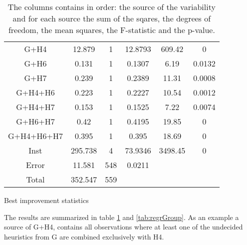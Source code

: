 \documentclass[../main.tex]{subfiles}
\begin{document}
\begin{table}
\begin{adjustbox}{width=\columnwidth,center}
\begin{subtable}{.85\columnwidth}
\begin{tabular}{cccccc}
            \hline
            G+H4        & 12.879    & 1 & 12.8793   & 609.42& 0     \\
            G+H6        & 0.131     & 1 & 0.1307    & 6.19  & 0.0132\\
            G+H7        & 0.239     & 1 & 0.2389    & 11.31 & 0.0008\\
            G+H4+H6     & 0.223     & 1 & 0.2227    & 10.54 & 0.0012\\
            G+H4+H7     & 0.153     & 1 & 0.1525    & 7.22  & 0.0074\\
            G+H6+H7     & 0.42      & 1 & 0.4195    & 19.85 & 0     \\
            G+H4+H6+H7  & 0.395     & 1 & 0.395     & 18.69 & 0     \\
            Inst        & 295.738   & 4 & 73.9346   &3498.45& 0     \\
            Error       & 11.581    &548& 0.0211    &       &       \\
            Total       & 352.547   &559&           &       &       \\
            \hline
            \end{tabular}
        \caption{Best improvement statistics}
            \label{tab:anovaBestGroup}
        \end{subtable}
    \end{adjustbox}
    \label{tab:anovaGroup}
    \caption*{The columns contains in order: the source of the variability and for each source the sum of the sqares, the degrees of freedom, the mean squares, the F-statistic and the p-value.}
\end{table}

The results are summarized in table \ref{tab:anovaGroup} and \cref{tab:regrGroup}. 
As an example a source of G+H4, contains all observations where at least one of the undecided heuristics from G are combined exclusively with H4.
\end{document}
